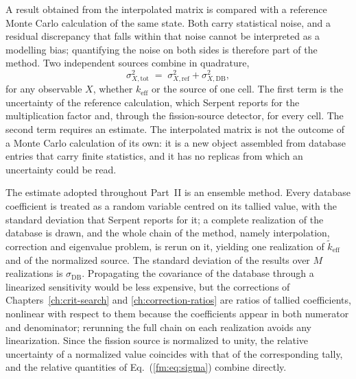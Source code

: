 A result obtained from the interpolated matrix is compared with a reference
Monte Carlo calculation of the same state. Both carry statistical noise, and a
residual discrepancy that falls within that noise cannot be interpreted as a
modelling bias; quantifying the noise on both sides is therefore part of the
method. Two independent sources combine in quadrature,
%
\begin{equation}
  \sigma_{X,\mathrm{tot}}^2 \;=\; \sigma_{X,\mathrm{ref}}^2 + \sigma_{X,\mathrm{DB}}^2,
  \label{fm:eq:sigma}
\end{equation}
%
for any observable $X$, whether $k_{\mathrm{eff}}$ or the source of one cell.
The first term is the uncertainty of the reference calculation, which Serpent
reports for the multiplication factor and, through the fission-source detector,
for every cell. The second term requires an estimate. The interpolated matrix
is not the outcome of a Monte Carlo calculation of its own: it is a new object
assembled from database entries that carry finite statistics, and it has no
replicas from which an uncertainty could be read.

The estimate adopted throughout Part~II is an ensemble method. Every
database coefficient is treated as a random variable centred on its tallied
value, with the standard deviation that Serpent reports for it; a complete
realization of the database is drawn, and the whole chain of the method, namely interpolation, correction and eigenvalue
problem, is rerun on it, yielding one
realization of $\tilde k_{\mathrm{eff}}$ and of the normalized source. The
standard deviation of the results over $M$ realizations is
$\sigma_{\mathrm{DB}}$. Propagating the covariance of the database through a
linearized sensitivity would be less expensive, but the corrections of
Chapters~\ref{ch:crit-search} and \ref{ch:correction-ratios} are ratios of
tallied coefficients, nonlinear with respect to them because the coefficients appear in
both numerator and denominator;
rerunning the full chain on each realization avoids any linearization. Since
the fission source is normalized to unity, the relative uncertainty of a
normalized value coincides with that of the corresponding tally, and the
relative quantities of Eq.~(\ref{fm:eq:sigma}) combine directly.

